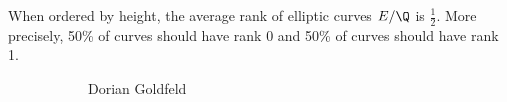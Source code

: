 \begin{frame}
	\begin{conj}
	When ordered by height, the average rank of elliptic curves $E/\Q$ is $\frac{1}{2}$. More precisely, 50\% of curves should have rank 0 and 50\% of curves should have rank 1.
	\end{conj}
	\begin{figure}[h]
	\centering
	\begin{subfigure}{0.3\textwidth}
	\captionsetup{labelformat=empty}
	\centering
	\caption{\hspace{0.5cm}Dorian Goldfeld}
	\end{subfigure} \quad\quad
	\begin{subfigure}{0.3\textwidth}
	\captionsetup{labelformat=empty}
	\centering

\end{subfigure}
\end{figure}
\end{frame}
